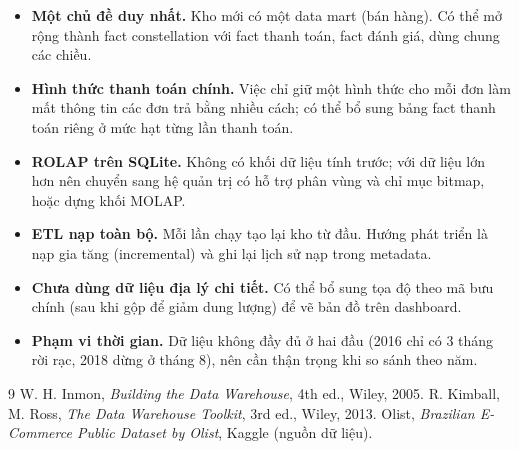 \documentclass[12pt,a4paper]{article}
\begin{document}
\begin{itemize}[nosep]
  \item \textbf{Một chủ đề duy nhất.} Kho mới có một data mart (bán hàng). Có thể mở rộng thành fact constellation
        với fact thanh toán, fact đánh giá, dùng chung các chiều.
  \item \textbf{Hình thức thanh toán chính.} Việc chỉ giữ một hình thức cho mỗi đơn làm mất thông tin các đơn trả
        bằng nhiều cách; có thể bổ sung bảng fact thanh toán riêng ở mức hạt từng lần thanh toán.
  \item \textbf{ROLAP trên SQLite.} Không có khối dữ liệu tính trước; với dữ liệu lớn hơn nên chuyển sang hệ quản trị
        có hỗ trợ phân vùng và chỉ mục bitmap, hoặc dựng khối MOLAP.
  \item \textbf{ETL nạp toàn bộ.} Mỗi lần chạy tạo lại kho từ đầu. Hướng phát triển là nạp gia tăng
        (incremental) và ghi lại lịch sử nạp trong metadata.
  \item \textbf{Chưa dùng dữ liệu địa lý chi tiết.} Có thể bổ sung tọa độ theo mã bưu chính (sau khi gộp để giảm
        dung lượng) để vẽ bản đồ trên dashboard.
  \item \textbf{Phạm vi thời gian.} Dữ liệu không đầy đủ ở hai đầu (2016 chỉ có 3 tháng rời rạc, 2018 dừng ở tháng 8), nên cần thận trọng khi
        so sánh theo năm.
\end{itemize}

\begin{thebibliography}{9}
 W. H. Inmon, \emph{Building the Data Warehouse}, 4th ed., Wiley, 2005.
 R. Kimball, M. Ross, \emph{The Data Warehouse Toolkit}, 3rd ed., Wiley, 2013.
 Olist, \emph{Brazilian E-Commerce Public Dataset by Olist}, Kaggle (nguồn dữ liệu).
\end{thebibliography}
\end{document}
